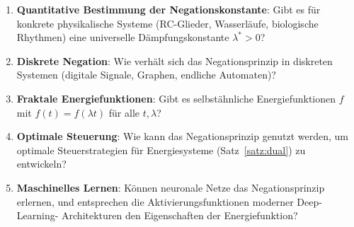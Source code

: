 ﻿\documentclass[a4paper,12pt]{article}
\theoremstyle{definition}
\begin{document}
\begin{enumerate}
    \item \textbf{Quantitative Bestimmung der Negationskonstante}: Gibt es f\"ur
          konkrete physikalische Systeme (RC-Glieder, Wasserl\"aufe, biologische
          Rhythmen) eine universelle D\"ampfungskonstante $\lambda^* > 0$?
    \item \textbf{Diskrete Negation}: Wie verh\"alt sich das Negationsprinzip in
          diskreten Systemen (digitale Signale, Graphen, endliche Automaten)?
    \item \textbf{Fraktale Energiefunktionen}: Gibt es selbst\"ahnliche
          Energiefunktionen $f$ mit $f(t) = f(\lambda t)$ f\"ur alle $t, \lambda$?
    \item \textbf{Optimale Steuerung}: Wie kann das Negationsprinzip genutzt werden,
          um optimale Steuerstrategien f\"ur Energiesysteme (Satz~\ref{satz:dual})
          zu entwickeln?
    \item \textbf{Maschinelles Lernen}: K\"onnen neuronale Netze das Negationsprinzip
          erlernen, und entsprechen die Aktivierungsfunktionen moderner Deep-Learning-
          Architekturen den Eigenschaften der Energiefunktion?
\end{enumerate}
\end{document}
